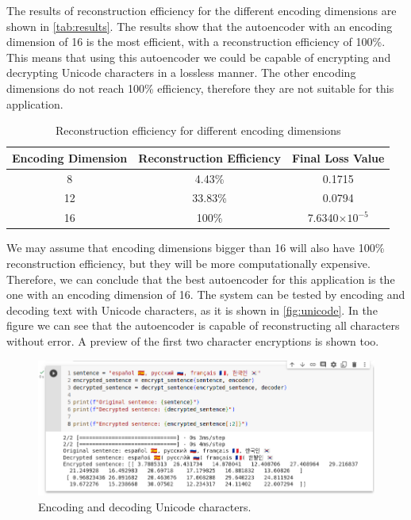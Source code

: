 The results of reconstruction efficiency for the different encoding dimensions are shown in \autoref{tab:results}. The results show that the autoencoder with an encoding dimension of 16 is the most efficient, with a reconstruction efficiency of 100\%. This means that using this autoencoder we could be capable of encrypting and decrypting Unicode characters in a lossless manner. The other encoding dimensions do not reach 100\% efficiency, therefore they are not suitable for this application.

\begin{table}[h]
    \centering
    \begin{tabular}{|c|c|c|}
        \hline
        Encoding Dimension & Reconstruction Efficiency & Final Loss Value      \\
        \hline
        8                  & 4.43\%                    & 0.1715                \\
        12                 & 33.83\%                   & 0.0794                \\
        16                 & 100\%                     & 7.6340$\times10^{-5}$ \\
        \hline
    \end{tabular}
    \caption{Reconstruction efficiency for different encoding dimensions}
    \label{tab:results}
\end{table}

We may assume that encoding dimensions bigger than 16 will also have 100\% reconstruction efficiency, but they will be more computationally expensive. Therefore, we can conclude that the best autoencoder for this application is the one with an encoding dimension of 16. The system can be tested by encoding and decoding text with Unicode characters, as it is shown in \autoref{fig:unicode}. In the figure we can see that the autoencoder is capable of reconstructing all characters without error. A preview of the first two character encryptions is shown too.

\begin{figure}[h]
    \centering
    \includegraphics[width=\textwidth]{img/unicode.png}
    \caption{Encoding and decoding Unicode characters.}
    \label{fig:unicode}
\end{figure}

